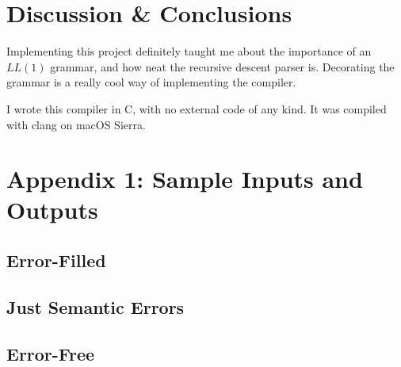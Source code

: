\documentclass[titlepage]{article}
\newcommand{\ShowSampleFile}[2]
{
    
}
\newcommand{\ShowTokenFile}[2]
{
    
}
\begin{document}
    \section{Discussion \& Conclusions}
    Implementing this project definitely taught me about the importance
    of an $LL(1)$ grammar, and how neat the recursive descent parser is.
    Decorating the grammar is a really cool way of implementing the compiler.

    I wrote this compiler in C, with no external code of any kind. It was
    compiled with clang on macOS Sierra.

    \clearpage{}
    \section*{Appendix 1: Sample Inputs and Outputs} %
    \subsection{Error-Filled}
    \ShowSampleFile{appendix1/error_full/error_full.pas}{Error-Full Source Code}
    \ShowSampleFile{appendix1/error_full/listing.txt}{Error-Full Listing File}
    \ShowSampleFile{appendix1/error_full/mem.txt}{Error-Full Semantic Mem File}
    \ShowTokenFile{appendix1/error_full/tokens.dat}{Error-Full Token File}

    \clearpage{}
    \subsection{Just Semantic Errors}
    \ShowSampleFile{appendix1/just_sem/debug.pas}{Just Semantic Source Code}
    \ShowSampleFile{appendix1/just_sem/listing.txt}{Just Semantic Listing File}
    \ShowSampleFile{appendix1/just_sem/mem.txt}{Just Semantic Mem File}
    \ShowTokenFile{appendix1/just_sem/tokens.dat}{Just Semantic Token File}

    \clearpage{}
    \subsection{Error-Free}
    \ShowSampleFile{appendix1/error_free/error_test.pas}{Error-Free Source Code}
    \ShowSampleFile{appendix1/error_free/listing.txt}{Error-Free Listing File}
    \ShowSampleFile{appendix1/error_free/mem.txt}{Error-Free Mem File}
    \ShowTokenFile{appendix1/error_free/tokens.dat}{Error-Free Token File}

    \twocolumn{}
\end{document}

